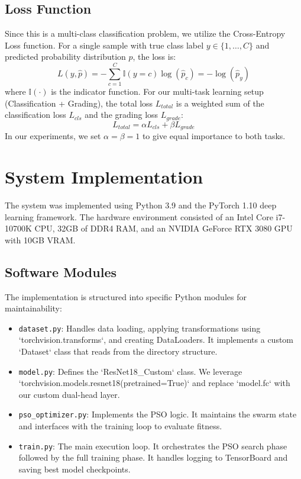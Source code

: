 \documentclass[journal]{IEEEtran}
\begin{document}
\subsection{Loss Function}
Since this is a multi-class classification problem, we utilize the Cross-Entropy Loss function. For a single sample with true class label $y \in \{1, \dots, C\}$ and predicted probability distribution $\hat{p}$, the loss is:
\begin{equation}
L(y, \hat{p}) = - \sum_{c=1}^{C} \mathbb{I}(y=c) \log(\hat{p}_c) = - \log(\hat{p}_y)
\end{equation}
where $\mathbb{I}(\cdot)$ is the indicator function.
For our multi-task learning setup (Classification + Grading), the total loss $L_{total}$ is a weighted sum of the classification loss $L_{cls}$ and the grading loss $L_{grade}$:
\begin{equation}
L_{total} = \alpha L_{cls} + \beta L_{grade}
\end{equation}
In our experiments, we set $\alpha = \beta = 1$ to give equal importance to both tasks.

\section{System Implementation}

The system was implemented using Python 3.9 and the PyTorch 1.10 deep learning framework. The hardware environment consisted of an Intel Core i7-10700K CPU, 32GB of DDR4 RAM, and an NVIDIA GeForce RTX 3080 GPU with 10GB VRAM.

\subsection{Software Modules}
The implementation is structured into specific Python modules for maintainability:
\begin{itemize}
    \item \texttt{dataset.py}: Handles data loading, applying transformations using `torchvision.transforms`, and creating DataLoaders. It implements a custom `Dataset` class that reads from the directory structure.
    \item \texttt{model.py}: Defines the `ResNet18_Custom` class. We leverage `torchvision.models.resnet18(pretrained=True)` and replace `model.fc` with our custom dual-head layer.
    \item \texttt{pso\_optimizer.py}: Implements the PSO logic. It maintains the swarm state and interfaces with the training loop to evaluate fitness.
    \item \texttt{train.py}: The main execution loop. It orchestrates the PSO search phase followed by the full training phase. It handles logging to TensorBoard and saving best model checkpoints.
\end{itemize}
\end{document}
